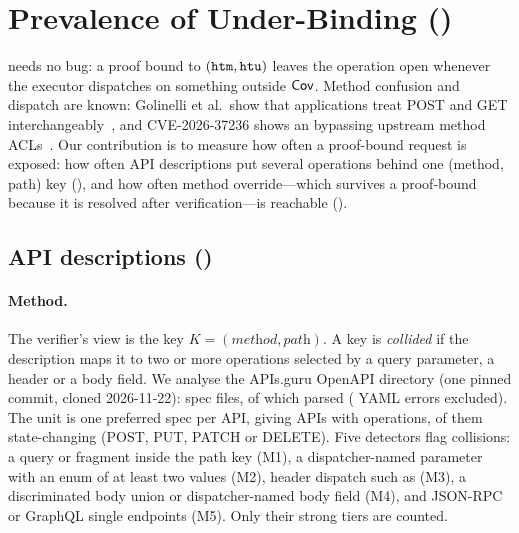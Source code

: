 \section{Prevalence of Under-Binding (\GA)}\label{sec:prevalence}

\GA needs no bug: a proof bound to $(\texttt{htm},\texttt{htu})$ leaves the operation open
whenever the executor dispatches on something outside $\mathsf{Cov}$. Method
confusion and dispatch are known: Golinelli et al.\ show that applications
treat POST and GET interchangeably~\cite{p2:golinelli2026post}, and
CVE-2026-37236 shows an  bypassing upstream method
ACLs~\cite{grpcgw2026cve37236}. Our contribution is to measure how often a
proof-bound request is exposed: how often API descriptions put several
operations behind one (method, path) key (), and how often method
override---which survives a proof-bound \htm because it is resolved after
verification---is reachable ().

\subsection{API descriptions ()}\label{sec:prev:e1}

\paragraph{Method.} The verifier's view is the key $K = (\textit{method},
\textit{path})$. A key is \emph{collided} if the description maps it to two or
more operations selected by a query parameter, a header or a body field. We
analyse the APIs.guru OpenAPI directory (one pinned commit, cloned 2026-11-22):
\NumSpecFiles{} spec files, of which \NumSpecFilesParsed{} parsed
(\NumSpecFilesFailed{} YAML errors excluded). The unit is one preferred spec per
API, giving \NumSpecs{} APIs with \NumOps{} operations, \NumStateChangingOps{}
of them state-changing (POST, PUT, PATCH or DELETE). Five detectors flag
collisions: a query or fragment inside the path key (M1), a dispatcher-named
parameter with an enum of at least two values (M2), header dispatch such as
 (M3), a discriminated body union or dispatcher-named body
field (M4), and JSON-RPC or GraphQL single endpoints (M5). Only their strong
tiers are counted.

